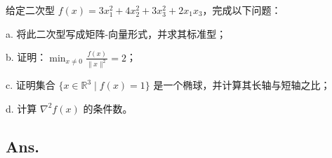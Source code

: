 \begin{example}
    给定二次型 \( f(x) = 3x_1^2 + 4x_2^2 + 3x_3^2 + 2x_1x_3 \)，完成以下问题：

    a. 将此二次型写成矩阵-向量形式，并求其标准型；
    
    b. 证明：\( \min_{x \neq 0} \frac{f(x)}{\|x\|^2} = 2 \)；
    
    c. 证明集合 \(\{x \in \mathbb{R}^3 \mid f(x) = 1\}\) 是一个椭球，并计算其长轴与短轴之比；
    
    d. 计算 \(\nabla^2 f(x)\) 的条件数。
    \end{example}
    
    \subsection*{Ans.}
    